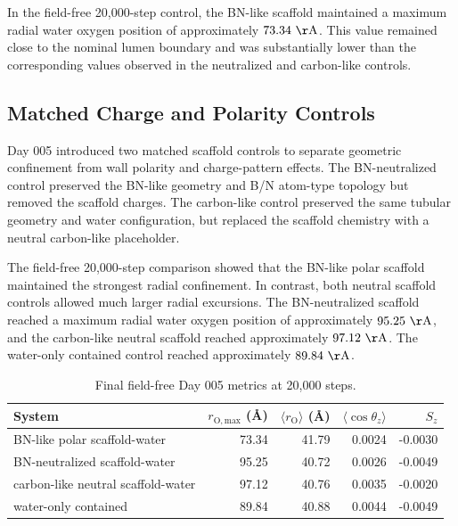 \documentclass[11pt,letterpaper]{article}
\begin{document}
In the field-free 20,000-step control, the BN-like scaffold maintained a maximum radial water oxygen position of approximately \(73.34~\mathrm{\AA}\). This value remained close to the nominal lumen boundary and was substantially lower than the corresponding values observed in the neutralized and carbon-like controls.

\subsection{Matched Charge and Polarity Controls}

Day 005 introduced two matched scaffold controls to separate geometric confinement from wall polarity and charge-pattern effects. The BN-neutralized control preserved the BN-like geometry and B/N atom-type topology but removed the scaffold charges. The carbon-like control preserved the same tubular geometry and water configuration, but replaced the scaffold chemistry with a neutral carbon-like placeholder.

The field-free 20,000-step comparison showed that the BN-like polar scaffold maintained the strongest radial confinement. In contrast, both neutral scaffold controls allowed much larger radial excursions. The BN-neutralized scaffold reached a maximum radial water oxygen position of approximately \(95.25~\mathrm{\AA}\), and the carbon-like neutral scaffold reached approximately \(97.12~\mathrm{\AA}\). The water-only contained control reached approximately \(89.84~\mathrm{\AA}\).

\begin{table}[h!]
\centering
\small
\caption{Final field-free Day 005 metrics at 20,000 steps.}
\begin{tabular}{|L{0.38\textwidth}|r|r|r|r|}
\hline
\textbf{System} &
\textbf{\(r_{\mathrm{O,max}}\) (\AA)} &
\textbf{\(\langle r_{\mathrm{O}}\rangle\) (\AA)} &
\textbf{\(\langle \cos\theta_z\rangle\)} &
\textbf{\(S_z\)} \\
\hline
BN-like polar scaffold-water & 73.34 & 41.79 & 0.0024 & -0.0030 \\
\hline
BN-neutralized scaffold-water & 95.25 & 40.72 & 0.0026 & -0.0049 \\
\hline
carbon-like neutral scaffold-water & 97.12 & 40.76 & 0.0035 & -0.0020 \\
\hline
water-only contained & 89.84 & 40.88 & 0.0044 & -0.0049 \\
\hline
\end{tabular}
\end{table}
\end{document}
